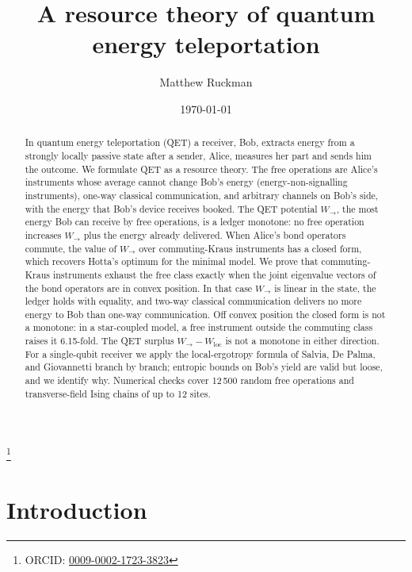 \documentclass[aps,pra,twocolumn,reprint,superscriptaddress,nofootinbib,floatfix]{revtex4-2}
\theoremstyle{plain}
\theoremstyle{remark}
\newcommand{\Wto}{W_{\to}}
\newcommand{\Wloc}{W_{\mathrm{loc}}}
\begin{document}
\title{A resource theory of quantum energy teleportation}

\author{Matthew Ruckman}
\thanks{ORCID: \href{https://orcid.org/0009-0002-1723-3823}{0009-0002-1723-3823}}

\date{\today}

\begin{abstract}
In quantum energy teleportation (QET) a receiver, Bob, extracts energy from a strongly
locally passive state after a sender, Alice, measures her part and sends him the outcome.
We formulate QET as a resource theory. The free operations are Alice's instruments whose
average cannot change Bob's energy (energy-non-signalling instruments), one-way classical
communication, and arbitrary channels on Bob's side, with the energy that Bob's device
receives booked. The QET potential $\Wto$, the most energy Bob can receive by free
operations, is a ledger monotone: no free operation increases $\Wto$ plus the energy
already delivered. When Alice's bond operators commute, the value of $\Wto$ over
commuting-Kraus instruments has a closed form, which recovers Hotta's optimum for the
minimal model. We prove that commuting-Kraus instruments exhaust the free class exactly
when the joint eigenvalue vectors of the bond operators are in convex position. In that
case $\Wto$ is linear in the state, the ledger holds with equality, and two-way classical
communication delivers no more energy to Bob than one-way communication. Off convex
position the closed form is not a monotone: in a star-coupled model, a free instrument
outside the commuting class raises it 6.15-fold. The QET surplus $\Wto-\Wloc$ is not a
monotone in either direction. For a single-qubit receiver we apply the local-ergotropy
formula of Salvia, De Palma, and Giovannetti branch by branch; entropic bounds on Bob's
yield are valid but loose, and we identify why. Numerical checks cover 12\,500 random free
operations and transverse-field Ising chains of up to 12 sites.
\end{abstract}

\maketitle

\section{Introduction}
\label{sec:intro}
\end{document}
